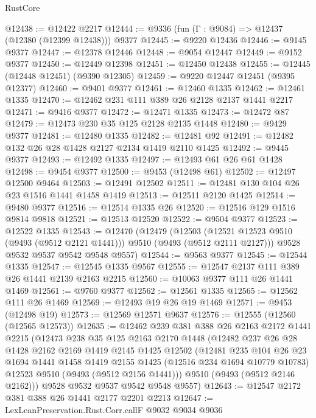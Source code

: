 \begin{lexlean}{RustCore}
\begin{coremodule}
@12438 := @12422 @2217
@12444 := @9336 (fun (Γ : @9084) => @12437 (@12380 (@12399 @12438))) @9377
@12445 := @9220 @12436
@12446 := @9145 @9377
@12447 := @12378 @12446
@12448 := @9054 @12447
@12449 := @9152 @9377
@12450 := @12449 @12398
@12451 := @12450 @12438
@12455 := @12445 (@12448 @12451) (@9390 @12305)
@12459 := @9220 @12447 @12451 (@9395 @12377)
@12460 := @9401 @9377
@12461 := @12460 @1335
@12462 := @12461 @1335
@12470 := @12462 @231 @111 @389 @26 @2128 @2137 @1441 @2217
@12471 := @9416 @9377
@12472 := @12471 @1335
@12473 := @12472 @87
@12479 := @12473 @230 @35 @125 @2128 @2135 @1448
@12480 := @9429 @9377
@12481 := @12480 @1335
@12482 := @12481 @92
@12491 := @12482 @132 @26 @28 @1428 @2127 @2134 @1419 @2110 @1425
@12492 := @9445 @9377
@12493 := @12492 @1335
@12497 := @12493 @61 @26 @61 @1428
@12498 := @9454 @9377
@12500 := @9453 (@12498 @61)
@12502 := @12497 @12500 @9464
@12503 := @12491 @12502
@12511 := @12481 @130 @104 @26 @23 @1516 @1441 @1458 @1419
@12513 := @12511 @2120 @1425
@12514 := @9480 @9377
@12516 := @12514 @1335 @26
@12520 := @12516 @129 @1516 @9814 @9818
@12521 := @12513 @12520
@12522 := @9504 @9377
@12523 := @12522 @1335
@12543 := @12470
    (@12479
      (@12503 (@12521 @12523 @9510 (@9493 (@9512 @2121 @1441))) @9510 (@9493 (@9512 @2111 @2127)))
      @9528
      @9532
      @9537
      @9542
      @9548
      @9557)
@12544 := @9563 @9377
@12545 := @12544 @1335
@12547 := @12545 @1335 @9567
@12555 := @12547 @2137 @111 @389 @26 @1441 @2139 @2163 @2215
@12560 := @10063 @9377 @111 @26 @1441 @1469
@12561 := @9760 @9377
@12562 := @12561 @1335
@12565 := @12562 @111 @26 @1469
@12569 := @12493 @19 @26 @19 @1469
@12571 := @9453 (@12498 @19)
@12573 := @12569 @12571 @9637
@12576 := @12555 (@12560 (@12565 @12573))
@12635 := @12462
    @239
    @381
    @388
    @26
    @2163
    @2172
    @1441
    @2215
    (@12473
      @238
      @35
      @125
      @2163
      @2170
      @1448
      (@12482
        @237
        @26
        @28
        @1428
        @2162
        @2169
        @1419
        @2145
        @1425
        @12502
        (@12481
          @235
          @104
          @26
          @23
          @1694
          @1441
          @1458
          @1419
          @2155
          @1425
          (@12516 @234 @1694 @10779 @10783)
          @12523
          @9510
          (@9493 (@9512 @2156 @1441)))
        @9510
        (@9493 (@9512 @2146 @2162)))
      @9528
      @9532
      @9537
      @9542
      @9548
      @9557)
@12643 := @12547 @2172 @381 @388 @26 @1441 @2177 @2201 @2213
@12647 := LexLeanPreservation.Rust.Corr.callF @9032 @9034 @9036

\end{coremodule}
\end{lexlean}
